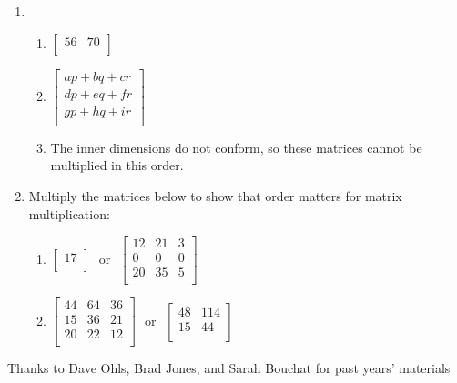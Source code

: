 \documentclass[11pt]{article}
\begin{document}
\begin{enumerate}
\item 
\begin{enumerate}
\item $\left[\begin{array}{cc}
56 & 70 \\
\end{array}\right]$
\item $
\left[\begin{array}{c}
ap + bq + cr \\
dp + eq + fr \\
gp + hq + ir \\
\end{array}\right]$
\item The inner dimensions do not conform, so these matrices cannot be multiplied in this order.
\end{enumerate}




\item Multiply the matrices below to show that order matters for matrix multiplication: \\

\begin{enumerate}
\item $\left[\begin{array}{c}
17 \\
\end{array}\right]
~~~\textrm{or}~~~
\left[\begin{array}{ccc}
12 & 21 & 3 \\
0  & 0  & 0 \\
20 & 35 & 5 \\
\end{array}\right]$
\item $\left[\begin{array}{ccc}
44 & 64 & 36 \\
15 & 36 & 21 \\
20 & 22 & 12 \\
\end{array}\right]
~~~\textrm{or}~~~
\left[\begin{array}{cc}
48 & 114 \\
15 & 44 \\
\end{array}\right]$
\end{enumerate}



\end{enumerate}




\vfill
\begin{center}
\small{Thanks to Dave Ohls, Brad Jones, and Sarah Bouchat for past years' materials}
\end{center}
\end{document}
